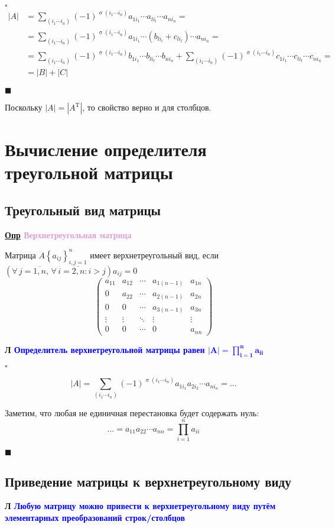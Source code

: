 \documentclass[12pt, a4paper]{report}
\newcommand{\sqbox}{%
	\collectbox{%
		\setlength{\fboxsep}{2pt}%
		\fbox{\BOXCONTENT}%
	}%
}
\newcommand{\df}[1][]{\begin{flushleft}\textbf{\underline{Опр} \textcolor{Plum}{#1}}\end{flushleft}}
\newcommand{\lm}[1][]{\begin{flushleft}\textbf{\sqbox{Л} \textcolor{Blue}{#1}}\end{flushleft}}
\newcommand{\inlineperm}[3][i]{{#1}_{#2}\dotsb{#1}_{#3}}
\let\oldforall\forall
\renewcommand{\forall}{\oldforall\,}
\begin{document}
	$\square$
	\begin{align*}
	|A| &= \sum_{(\inlineperm{1}{n})}(-1)^{\upsigma(\inlineperm{1}{n})}a_{1i_1}\cdots a_{li_l}\cdots a_{ni_n}=
	\\[5pt]&=\sum_{(\inlineperm{1}{n})}(-1)^{\upsigma(\inlineperm{1}{n})}a_{1i_1}\cdots (b_{li_l}+c_{li_l})\cdots a_{ni_n}=
	\\[5pt]&=\sum_{(\inlineperm{1}{n})}(-1)^{\upsigma(\inlineperm{1}{n})}b_{1i_1}\cdots b_{li_l}\cdots b_{ni_n} + \sum_{(\inlineperm{1}{n})}(-1)^{\upsigma(\inlineperm{1}{n})}c_{1i_1}\cdots c_{li_l}\cdots c_{ni_n}=
	\\[5pt]&=|B|+|C|
	\end{align*}
	
	$\blacksquare$
	\smallskip
	
	Поскольку $|A|=\left|A^{\mathrm{T}}\right|$, то свойство верно и для столбцов.
	\section{Вычисление определителя треугольной матрицы}
	\subsection{Треугольный вид матрицы}
	\df[Верхнетреугольная матрица]
	
	Матрица $A\left\{a_{ij}\right\}_{i,j=1}^{n}$ имеет верхнетреугольный вид, если $\left(\forall j =\overline{1,n},\, \forall i =\overline{2,n}: i>j\right) a_{ij} = 0$
	\[
	\begin{pmatrix} 
	a_{11}&a_{12}&\dotsb&a_{1(n-1)}&a_{1n}\\
	0&a_{22}&\cdots&a_{2(n-1)}&a_{2n}\\
	0&0&\cdots&a_{3(n-1)}&a_{3n}\\
	\vdots&\vdots&\ddots&\vdots&\vdots\\
	0&0&\cdots&0&a_{nn}
	\end{pmatrix}
	\]
	\lm[Определитель верхнетреугольной матрицы равен $\displaystyle\boldsymbol{|A|=\prod_{i=1}^{n}a_{ii}}$]
	
	$\square$
	
	\[
	|A| = \sum_{(\inlineperm{1}{n})}(-1)^{\upsigma(\inlineperm{1}{n})}a_{1i_1}a_{2i_2}\cdots a_{ni_n}=\dotso
	\]
	
	Заметим, что любая не единичная перестановка будет содержать нуль:
	\[
	\dotso=a_{11}a_{22}\cdots a_{nn}=\prod_{i=1}^{n}a_{ii}
	\]
	
	$\blacksquare$
	\subsection{Приведение матрицы к верхнетреугольному виду}
	\lm[Любую матрицу можно привести к верхнетреугольному виду путём элементарных преобразований строк/столбцов]
	
\end{document}
